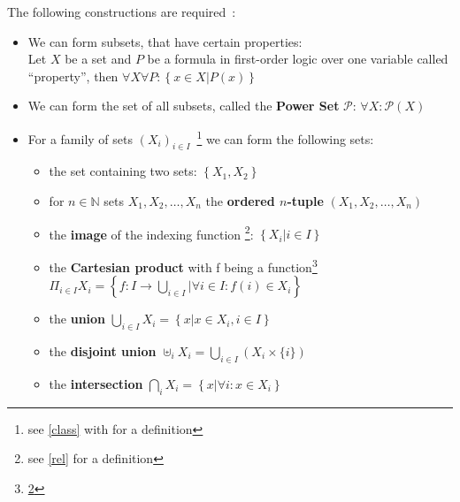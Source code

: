             The following constructions are required~\autocite{CT1}:
            \begin{definition}[Set]
                \begin{itemize}
                 \item We can form subsets, that have certain properties: \\
                 Let $X$ be a set and $P$ be a formula in first-order logic over one variable called "`property"', then $\forall X \forall P: \left\{ x \in X | P(x) \right\} $
                 
                 \item We can form the set of all subsets, called the \textbf{Power Set} $\mathcal{P}$: $\forall X: \mathcal{P}(X)$
                

                \item For a family of sets $\left( X_i\right)_{i \in I}$~\footnote{see \ref{class} with for a definition} we can form the following sets:
                    \begin{itemize}
                     \item the set containing two sets: $\left\{ X_1, X_2 \right\}$
                     
                     \item for $n \in \mathbb{N}$ sets $X_1, X_2, \dots, X_n$ the \textbf{ordered $n$-tuple} $(X_1, X_2, \dots, X_n)$
                     
                     \item the \textbf{image} of the indexing function \footnote{\label{note1}see \ref{rel} for a definition}: $\left\{ X_i | i \in I \right\}$
                     
                      \item the \textbf{Cartesian product} with f being a function\footnote{\ref{note1}} $\Pi_{i \in I} X_i = \left\{ f: I \rightarrow \bigcup_{i \in I} | \forall i \in I: f(i) \in X_i \right\}$
                      
                      \item the \textbf{union} $\bigcup_{i \in I} X_i = \left\{ x | x \in X_i, i \in I \right\}$
                     
                     \item the \textbf{disjoint union} $\uplus_i X_i = \bigcup_{i \in I} \left( X_i \times \{ i \} \right)$
                     
                     \item the \textbf{intersection} $\bigcap_i X_i = \left\{ x | \forall i: x \in X_i \right\}$
                     

\end{itemize}
\end{itemize}
\end{definition}
